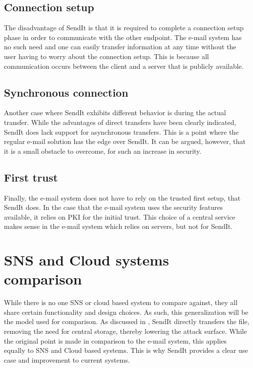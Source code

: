   \subsection{Connection setup}
  \label{sec:ev_con}
  The disadvantage of SendIt is that it is required to complete a connection setup phase in order to communicate with the other endpoint. The e-mail system has no such need and one can easily transfer information at any time without the user having to worry about the connection setup. This is because all communication occurs between the client and a server that is publicly available.
%
  \subsection{Synchronous connection}
  Another case where SendIt exhibits different behavior is during the actual transfer. While the advantages of direct transfers have been clearly indicated, SendIt does lack support for asynchronous transfers. This is a point where the regular e-mail solution has the edge over SendIt. It can be argued, however, that it is a small obstacle to overcome, for such an increase in security.
%
  \subsection{First trust}
  \label{sec:ev_first}
  Finally, the e-mail system does not have to rely on the trusted first setup, that SendIt does. In the case that the e-mail system uses the security features available, it relies on PKI for the initial trust. This choice of a central service makes sense in the e-mail system which relies on servers, but not for SendIt.
%
\section{SNS and Cloud systems comparison}
  While there is no one SNS or cloud based system to compare against, they all share certain functionality and design choices. As such, this generalization will be the model used for comparison. As discussed in , SendIt directly transfers the file, removing the need for central storage, thereby lowering the attack surface. While the original point is made in comparison to the e-mail system, this applies equally to SNS and Cloud based systems. This is why SendIt provides a clear use case and improvement to current systems.
%
